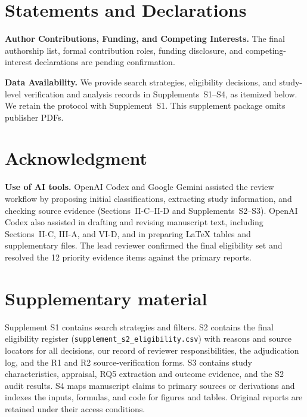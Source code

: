 \documentclass[journal]{IEEEtran}
\begin{document}
\section*{Statements and Declarations}
\textbf{Author Contributions, Funding, and Competing Interests.} The final authorship list, formal contribution roles, funding disclosure, and competing-interest declarations are pending confirmation. \par\textbf{Data Availability.} We provide search strategies, eligibility decisions, and study-level verification and analysis records in Supplements~S1--S4, as itemized below. We retain the protocol with Supplement~S1. This supplement package omits publisher PDFs.

\section*{Acknowledgment}
\textbf{Use of AI tools.} OpenAI Codex and Google Gemini assisted the review workflow by proposing initial classifications, extracting study information, and checking source evidence (Sections~II-C--II-D and Supplements~S2--S3). OpenAI Codex also assisted in drafting and revising manuscript text, including Sections~II-C, III-A, and VI-D, and in preparing LaTeX tables and supplementary files. The lead reviewer confirmed the final eligibility set and resolved the 12 priority evidence items against the primary reports.

\section*{Supplementary material}
Supplement S1 contains search strategies and filters. S2 contains the final eligibility register (\nolinkurl{supplement_s2_eligibility.csv}) with reasons and source locators for all decisions, our record of reviewer responsibilities, the adjudication log, and the R1 and R2 source-verification forms. S3 contains study characteristics, appraisal, RQ5 extraction and outcome evidence, and the S2 audit results. S4 maps manuscript claims to primary sources or derivations and indexes the inputs, formulas, and code for figures and tables. Original reports are retained under their access conditions.



\end{document}
